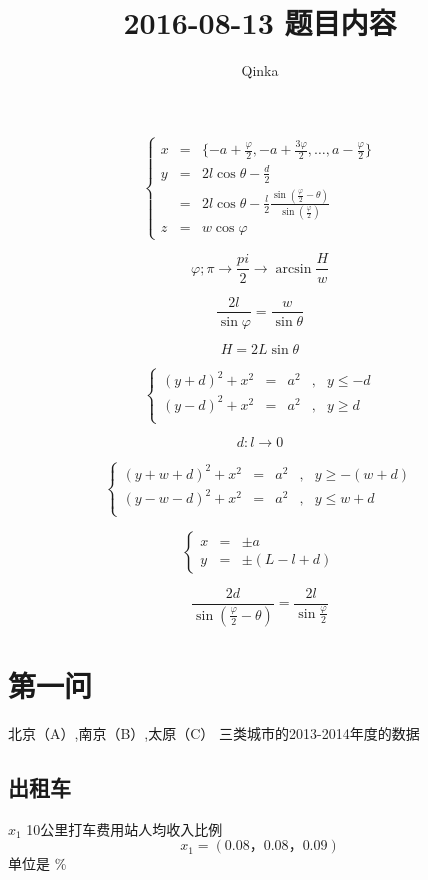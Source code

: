 \documentclass{ctexart}
\author{Qinka}
\title{2016-08-13 题目内容}
\def\pandoc{1}
\begin{document}
    \ifx\pandoc \undefined
    
    \fi
    $$\left\{ \begin{array}{lll}
    x & = & \{-a + \frac{\varphi}{2},-a + \frac{3\varphi}{2},\dots,a - \frac{\varphi}{2}\}  \\
    y & = & 2l\cos \theta-\frac{d}{2}\\
    & = & 2l\cos \theta - \frac{l}{2}\frac{\sin(\frac{\varphi}{2}-\theta)}{\sin(\frac{\varphi}{2})}\\
    z & = & w \cos \varphi 
    \end{array}$$
    
    $$\varphi ; \pi \rightarrow \frac{pi}{2} \rightarrow \arcsin\frac{H}{w}$$
    
    $$\frac{2l}{\sin\varphi} = \frac{w}{\sin\theta}$$
    
    $$H=2L\sin\theta$$
    
    $$\left\{\begin{array}{lllll}
    (y+d)^2+x^2 &=& a^2&,&y\leq -d\\
    (y-d)^2+x^2 &=& a^2&,&y\geq d \\
    \end{array}$$
    
    $$d:l\rightarrow 0$$
    
    $$\left\{\begin{array}{lllll}
    (y+w+d)^2+x^2 &=& a^2&,&y\geq -(w+d)\\
    (y-w-d)^2+x^2 &=& a^2&,&y\leq w+d \\
    \end{array}$$
    
    $$\left\{\begin{array}{lll}
    x &=& \pm a\\
    y &=& \pm(L-l+d)
    \end{array}$$
    
    $$\frac{2d}{\sin(\frac{\varphi}{2}-\theta)}=\frac{2l}{\sin\frac{\varphi}{2}}$$
    
    \section{第一问}
    \label{sec:q1}
    北京（A）,南京（B）,太原（C） 三类城市的2013-2014年度的数据
    \subsection{出租车}
    $x_1$ 10公里打车费用站人均收入比例
    $$x_1=(0.08 ，0.08，0.09)$$
    单位是 \%
    
\end{document}
